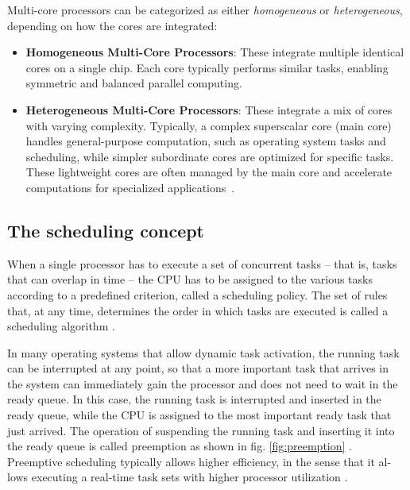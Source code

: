 \documentclass[conference]{IEEEtran}
\begin{document}
Multi-core processors can be categorized as either \textit{homogeneous} or \textit{heterogeneous}, depending on how the cores are integrated:
\begin{itemize}
    \item \textbf{Homogeneous Multi-Core Processors}: These integrate multiple identical cores on a single chip. Each core typically performs similar tasks, enabling symmetric and balanced parallel computing.
    \item \textbf{Heterogeneous Multi-Core Processors}: These integrate a mix of cores with varying complexity. Typically, a complex superscalar core (main core) handles general-purpose computation, such as operating system tasks and scheduling, while simpler subordinate cores are optimized for specific tasks. These lightweight cores are often managed by the main core and accelerate computations for specialized applications~\cite{6234619}.
\end{itemize}



\subsection{The scheduling concept}
\label{subsec: scheduling approach on multicore architecture}
When a single processor has to execute a set of concurrent tasks – that is, tasks that can overlap in time – the CPU has to be assigned to the various tasks according to a predefined criterion, called a scheduling policy. The set of rules that, at any time, determines the order in which tasks are executed is called a scheduling algorithm \cite{butazo99}.

In many operating systems that allow dynamic task activation, the running task can be interrupted at any point, so that a more important task that arrives in the system can immediately gain the processor and does not need to wait in the ready queue. In this case, the running task is interrupted and inserted in the ready queue, while the CPU is assigned to the most important ready task that just arrived. The operation of suspending the running task and inserting it into the ready queue is called preemption as shown in fig. \ref{fig:preemption}  \cite{butazo99}. Preemptive scheduling typically allows higher efficiency, in the sense that it al-
lows executing a real-time task sets with higher processor utilization \cite{butazo99}.
\end{document}
